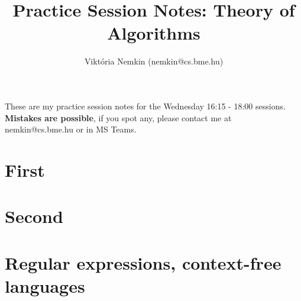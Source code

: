 \documentclass[14pt,a4paper]{article}
\title{Practice Session Notes: Theory of Algorithms}
\author{Viktória Nemkin (nemkin@cs.bme.hu)}
\date{}
\begin{document}
\maketitle

These are my practice session notes for the Wednesday 16:15 - 18:00 sessions. \textbf{Mistakes are possible}, if you spot any, please contact me at nemkin@cs.bme.hu or in MS Teams.

\section{First}

\section{Second}

\section{Regular expressions, context-free languages}













\end{document}

